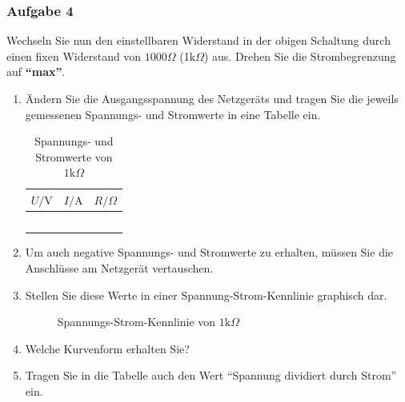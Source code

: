 \subsubsection{Aufgabe 4}
Wechseln Sie nun den einstellbaren Widerstand in der obigen Schaltung durch einen fixen Widerstand von $1000\Omega$ (1$\text{k}\Omega$) aus. Drehen Sie die Strombegrenzung auf \textbf{``max''}.
\begin{enumerate}[$a)$]
\item Ändern Sie die Ausgangsspannung des Netzgeräts und tragen Sie die jeweils gemessenen Spannungs- und Stromwerte in eine Tabelle ein. 
\begin{table}[H]
\centering
\begin{tabular}{ccc}\hline
$U/\text{V}$&$I/\text{A}$&$R/\Omega$\\\hline
&&\\
&&\\
&&\\
&&\\
&&\\\hline
\end{tabular}
\caption{Spannungs- und Stromwerte von $1\text{k}\Omega$}
\end{table}
\item Um auch negative Spannungs- und Stromwerte zu erhalten, müssen Sie die Anschlüsse am Netzgerät vertauschen. 
\item Stellen Sie diese Werte in einer Spannung-Strom-Kennlinie graphisch dar. 
\begin{figure}[H]
\centering
{}
\caption{Spannungs-Strom-Kennlinie von $1\text{k}\Omega$}
\end{figure}
\item Welche Kurvenform erhalten Sie? 
\item Tragen Sie in die Tabelle auch den Wert ``Spannung dividiert durch Strom'' ein.
\end{enumerate}
